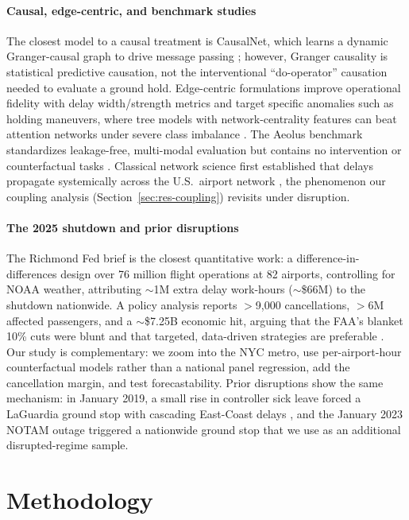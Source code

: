 \documentclass[10pt,journal]{IEEEtran}
\begin{document}
\paragraph{Causal, edge-centric, and benchmark studies}
The closest model to a causal treatment is CausalNet, which learns a dynamic
Granger-causal graph to drive message passing \cite{zhu2024}; however, Granger
causality is statistical predictive causation, not the interventional
``do-operator'' causation needed to evaluate a ground hold. Edge-centric
formulations improve operational fidelity with delay width/strength metrics
\cite{tang2026} and target specific anomalies such as holding maneuvers, where
tree models with network-centrality features can beat attention networks under
severe class imbalance \cite{franco2026}. The Aeolus benchmark standardizes
leakage-free, multi-modal evaluation but contains no intervention or
counterfactual tasks \cite{xu2025}. Classical network science first established
that delays propagate systemically across the U.S.\ airport network
\cite{fleurquin2013}, the phenomenon our coupling analysis
(Section~\ref{sec:res-coupling}) revisits under disruption.

\paragraph{The 2025 shutdown and prior disruptions}
The Richmond Fed brief \cite{richmondfed2025} is the closest quantitative work:
a difference-in-differences design over 76 million flight operations at 82
airports, controlling for NOAA weather, attributing $\sim$1M extra delay
work-hours ($\sim$\$66M) to the shutdown nationwide. A policy analysis reports
$>$9{,}000 cancellations, $>$6M affected passengers, and a $\sim$\$7.25B
economic hit, arguing that the FAA's blanket 10\% cuts were blunt and that
targeted, data-driven strategies are preferable \cite{ctp2026}. Our study is
complementary: we zoom into the NYC metro, use per-airport-hour counterfactual
models rather than a national panel regression, add the cancellation margin,
and test forecastability. Prior disruptions show the same mechanism: in January
2019, a small rise in controller sick leave forced a LaGuardia ground stop with
cascading East-Coast delays \cite{npr2019}, and the January 2023 NOTAM outage
triggered a nationwide ground stop \cite{icao2023notam, dot2023notam} that we
use as an additional disrupted-regime sample.

\section{Methodology}
\label{sec:method}
\end{document}
